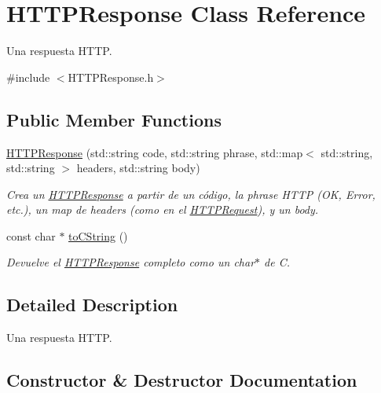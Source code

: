 \hypertarget{class_h_t_t_p_response}{}\section{H\+T\+T\+P\+Response Class Reference}
\label{class_h_t_t_p_response}


Una respuesta H\+T\+T\+P.  




{\ttfamily \#include $<$H\+T\+T\+P\+Response.\+h$>$}

\subsection*{Public Member Functions}
\begin{DoxyCompactItemize}
\item 
\hyperlink{class_h_t_t_p_response_a80cb475ed37530e4005dc1a2b1849fe3}{H\+T\+T\+P\+Response} (std\+::string code, std\+::string phrase, std\+::map$<$ std\+::string, std\+::string $>$ headers, std\+::string body)
\begin{DoxyCompactList}\small\item\em Crea un \hyperlink{class_h_t_t_p_response}{H\+T\+T\+P\+Response} a partir de un código, la phrase H\+T\+T\+P (O\+K, Error, etc.), un map de headers (como en el \hyperlink{class_h_t_t_p_request}{H\+T\+T\+P\+Request}), y un body. \end{DoxyCompactList}\item 
const char $\ast$ \hyperlink{class_h_t_t_p_response_acf3cc435114cf49b8531afa7c1fc5d4a}{to\+C\+String} ()
\begin{DoxyCompactList}\small\item\em Devuelve el \hyperlink{class_h_t_t_p_response}{H\+T\+T\+P\+Response} completo como un char$\ast$ de C. \end{DoxyCompactList}\end{DoxyCompactItemize}


\subsection{Detailed Description}
Una respuesta H\+T\+T\+P. 

\subsection{Constructor \& Destructor Documentation}
\hypertarget{class_h_t_t_p_response_a80cb475ed37530e4005dc1a2b1849fe3}{}
